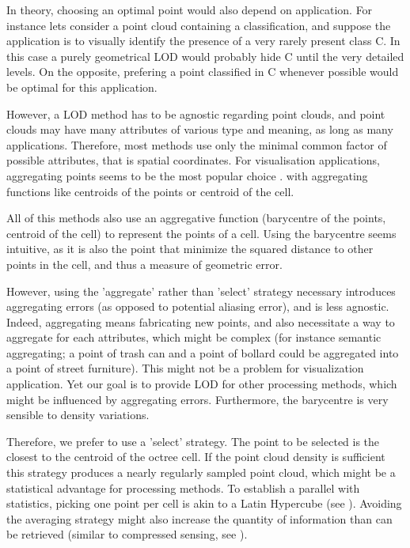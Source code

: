 	In theory, choosing an optimal point would also depend on application.
	For instance lets consider a point cloud containing a classification, and suppose the application is to visually identify the presence of a very rarely present class C.
	In this case a purely geometrical LOD would probably hide C until the very detailed levels. On the opposite, prefering a point classified in C whenever possible would be optimal for this application.
	
	However, a LOD method has to be agnostic regarding point clouds,
	and point clouds may have many attributes of various type and meaning, as long as many applications.
	Therefore, most methods use only the minimal common factor of possible attributes, that is spatial coordinates. 
	For visualisation applications, aggregating points seems to be the most popular choice \cite{Schutz2015,Hornung2013,Elseberg2013}. with aggregating functions like centroids of the points or centroid of the cell.
	
	All of this methods also use an aggregative function (barycentre of the points, centroid of the cell) to represent the points of a cell.
	Using the barycentre seems intuitive, as it is also the point that minimize the squared distance to other points in the cell, and thus a measure of geometric error.
	
	However, using the 'aggregate' rather than 'select' strategy necessary introduces aggregating errors
	 (as opposed to potential aliasing error), and is less agnostic.
	Indeed, aggregating means fabricating new points, and also necessitate a way to aggregate for each attributes, which might be complex (for instance semantic aggregating; a point of trash can and a point of bollard could be aggregated into a point of street furniture).
	This might not be a problem for visualization application.
	Yet our goal is to provide LOD for other processing methods, which might be influenced by aggregating errors.
	Furthermore, the barycentre is very sensible to density variations.
	
	Therefore, we prefer to use a 'select' strategy. The point to be selected is the closest to the centroid of the octree cell.
	If the point cloud density is sufficient this strategy produces a nearly regularly sampled point cloud, which might be a statistical advantage for processing methods. 
	To establish a parallel with statistics, picking one point per cell is akin to a Latin Hypercube (see \cite{McKay1979}).
	Avoiding the averaging strategy might also increase the quantity of information than can be retrieved (similar to compressed sensing, see \cite{Fornasier2010}).
	
